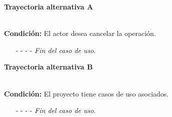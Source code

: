 	\hypertarget{CU2-3:TAA}{\textbf{Trayectoria alternativa A}}\\
	\noindent \textbf{Condición:} El actor desea cancelar la operación.
	\begin{enumerate}
		\UCpaso[\UCactor] Solicita cancelar la operación oprimiendo el botón  de la ventana emergente.
		\UCpaso[\UCsist] Muestra la pantalla .
		\item[- -] - - {\em {Fin del caso de uso}}.%
	\end{enumerate}

	\hypertarget{CU2-3:TAB}{\textbf{Trayectoria alternativa B}}\\
	\noindent \textbf{Condición:} El proyecto tiene casos de uso asociados.
	\begin{enumerate}
		\UCpaso[\UCsist] Muestra la pantalla  con el mensaje .
		\item[- -] - - {\em {Fin del caso de uso}}.%
	\end{enumerate}
